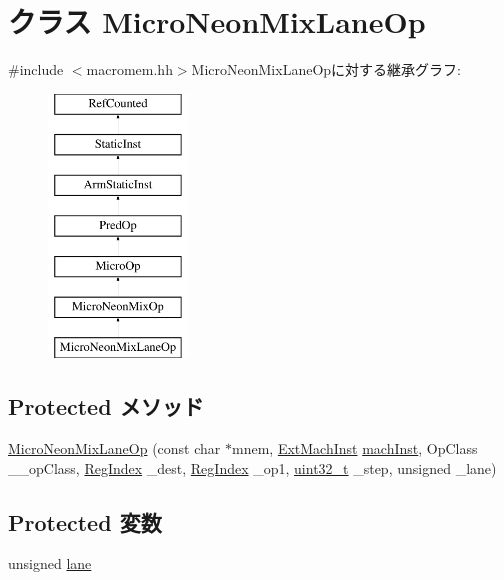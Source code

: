 \hypertarget{classArmISA_1_1MicroNeonMixLaneOp}{
\section{クラス MicroNeonMixLaneOp}
\label{classArmISA_1_1MicroNeonMixLaneOp}
}


{\ttfamily \#include $<$macromem.hh$>$}MicroNeonMixLaneOpに対する継承グラフ:\begin{figure}[H]
\begin{center}
\leavevmode
\includegraphics[height=7cm]{classArmISA_1_1MicroNeonMixLaneOp}
\end{center}
\end{figure}
\subsection*{Protected メソッド}
\begin{DoxyCompactItemize}
\item 
\hyperlink{classArmISA_1_1MicroNeonMixLaneOp_af3cc50e0446af48efb448a4cf391165c}{MicroNeonMixLaneOp} (const char $\ast$mnem, \hyperlink{classStaticInst_a5605d4fc727eae9e595325c90c0ec108}{ExtMachInst} \hyperlink{classStaticInst_a744598b194ca3d4201d9414ce4cc4af4}{machInst}, OpClass \_\-\_\-opClass, \hyperlink{classStaticInst_a36d25e03e43fa3bb4c5482cbefe5e0fb}{RegIndex} \_\-dest, \hyperlink{classStaticInst_a36d25e03e43fa3bb4c5482cbefe5e0fb}{RegIndex} \_\-op1, \hyperlink{Type_8hh_a435d1572bf3f880d55459d9805097f62}{uint32\_\-t} \_\-step, unsigned \_\-lane)
\end{DoxyCompactItemize}
\subsection*{Protected 変数}
\begin{DoxyCompactItemize}
\item 
unsigned \hyperlink{classArmISA_1_1MicroNeonMixLaneOp_a11dafb05e242b40250edce6bc9cfd29f}{lane}
\end{DoxyCompactItemize}


